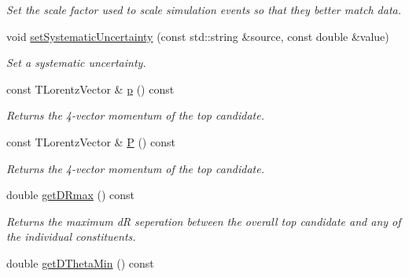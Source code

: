 \begin{DoxyCompactItemize}
\begin{DoxyCompactList}\small\item\em Set the scale factor used to scale simulation events so that they better match data. \end{DoxyCompactList}\item 
\hypertarget{classTopObject_ab74f18904e7753255374de8fe1ddce89}{void \hyperlink{classTopObject_ab74f18904e7753255374de8fe1ddce89}{set\-Systematic\-Uncertainty} (const std\-::string \&source, const double \&value)}\label{classTopObject_ab74f18904e7753255374de8fe1ddce89}

\begin{DoxyCompactList}\small\item\em Set a systematic uncertainty. \end{DoxyCompactList}\item 
\hypertarget{classTopObject_a52fbbf2a336d0e174f509304f8c1c984}{const T\-Lorentz\-Vector \& \hyperlink{classTopObject_a52fbbf2a336d0e174f509304f8c1c984}{p} () const }\label{classTopObject_a52fbbf2a336d0e174f509304f8c1c984}

\begin{DoxyCompactList}\small\item\em Returns the 4-\/vector momentum of the top candidate. \end{DoxyCompactList}\item 
\hypertarget{classTopObject_ac59c3a52925131b1ea7e5bf5c014aa2d}{const T\-Lorentz\-Vector \& \hyperlink{classTopObject_ac59c3a52925131b1ea7e5bf5c014aa2d}{P} () const }\label{classTopObject_ac59c3a52925131b1ea7e5bf5c014aa2d}

\begin{DoxyCompactList}\small\item\em Returns the 4-\/vector momentum of the top candidate. \end{DoxyCompactList}\item 
\hypertarget{classTopObject_ad6c8e1a0ef46d400075b1c2dbb05e37d}{double \hyperlink{classTopObject_ad6c8e1a0ef46d400075b1c2dbb05e37d}{get\-D\-Rmax} () const }\label{classTopObject_ad6c8e1a0ef46d400075b1c2dbb05e37d}

\begin{DoxyCompactList}\small\item\em Returns the maximum d\-R seperation between the overall top candidate and any of the individual constituents. \end{DoxyCompactList}\item 
\hypertarget{classTopObject_a6751962b83bc4b348cebee05aa23c299}{double \hyperlink{classTopObject_a6751962b83bc4b348cebee05aa23c299}{get\-D\-Theta\-Min} () const }\label{classTopObject_a6751962b83bc4b348cebee05aa23c299}


\end{DoxyCompactItemize}
